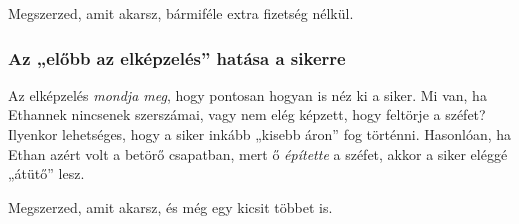 Megszerzed, amit akarsz, bármiféle extra fizetség nélkül.


\subsubsection{Az „előbb az elképzelés” hatása a sikerre}

Az elképzelés \emph{mondja meg}, hogy pontosan hogyan is néz ki a siker. Mi van, ha Ethannek nincsenek szerszámai, vagy nem elég képzett, hogy feltörje a széfet? Ilyenkor lehetséges, hogy a siker inkább „kisebb áron” fog történni. Hasonlóan, ha Ethan azért volt a betörő csapatban, mert ő \emph{építette} a széfet, akkor a siker eléggé „átütő” lesz.


Megszerzed, amit akarsz, és még egy kicsit többet is.

